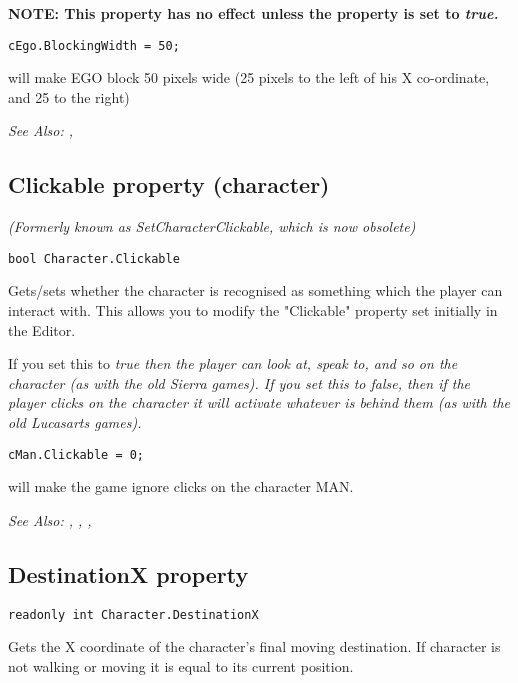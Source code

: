 \bf{NOTE:} This property has no effect unless the  property
is set to \it{true}.

\begin{verbatim}
cEgo.BlockingWidth = 50;
\end{verbatim}
will make EGO block 50 pixels wide (25 pixels to the left of his X co-ordinate, and 25 to the right)

\it{See Also:} ,


\subsection{Clickable property (character)}\label{Character.Clickable}%

\it{(Formerly known as SetCharacterClickable, which is now obsolete)}

\begin{verbatim}
bool Character.Clickable
\end{verbatim}
Gets/sets whether the character is recognised as something which the
player can interact with. This allows you to modify the "Clickable"
property set initially in the Editor.

If you set this to \it{true} then the player can look at, speak to, and so on
the character (as with the old Sierra games). If you set this to \it{false}, then
if the player clicks on the character it will activate whatever is behind
them (as with the old Lucasarts games).

\begin{verbatim}
cMan.Clickable = 0;
\end{verbatim}
will make the game ignore clicks on the character MAN.

\it{See Also:} ,
,
,


\subsection{DestinationX property}\label{Character.DestinationX}%

\begin{verbatim}
readonly int Character.DestinationX
\end{verbatim}
Gets the X coordinate of the character's final moving destination. If character is not walking
or moving it is equal to its current position.

